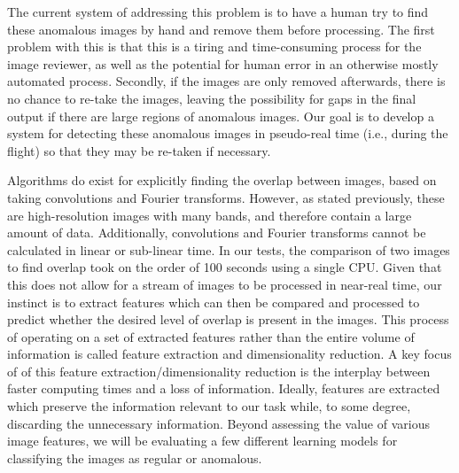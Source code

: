 The current system of addressing this problem is to have a human try to find these anomalous images by hand and remove them before processing.
The first problem with this is that this is a tiring and time-consuming process for the image reviewer, as well as the potential for human error in an otherwise mostly automated process.
Secondly, if the images are only removed afterwards, there is no chance to re-take the images, leaving the possibility for gaps in the final output if there are large regions of anomalous images.
Our goal is to develop a system for detecting these anomalous images in pseudo-real time (i.e., during the flight) so that they may be re-taken if necessary.

Algorithms do exist for explicitly finding the overlap between images, based on taking convolutions and Fourier transforms.
However, as stated previously, these are high-resolution images with many bands, and therefore contain a large amount of data.
Additionally, convolutions and Fourier transforms cannot be calculated in linear or sub-linear time.
In our tests, the comparison of two images to find overlap took on the order of 100 seconds using a single CPU.
Given that this does not allow for a stream of images to be processed in near-real time, our instinct is to extract features which can then be compared and processed to predict whether the desired level of overlap is present in the images.
This process of operating on a set of extracted features rather than the entire volume of information is called feature extraction and dimensionality reduction.
A key focus of of this feature extraction/dimensionality reduction is the interplay between faster computing times and a loss of information.
Ideally, features are extracted which preserve the information relevant to our task while, to some degree, discarding the unnecessary information.
Beyond assessing the value of various image features, we will be evaluating a few different learning models for classifying the images as regular or anomalous.



